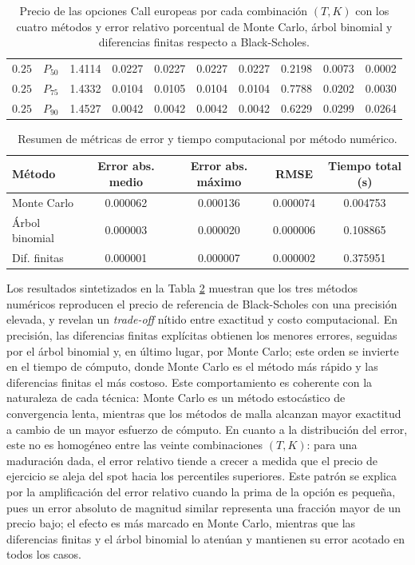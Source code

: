 \documentclass{article}
\begin{document}
\begin{table}[H]
{\begin{tabular}{llrrrrrrrr}
$0.25$   & $P_{50}$ & 1.4114 & 0.0227 & 0.0227 & 0.0227 & 0.0227 & 0.2198 & 0.0073 & 0.0002 \\
$0.25$   & $P_{75}$ & 1.4332 & 0.0104 & 0.0105 & 0.0104 & 0.0104 & 0.7788 & 0.0202 & 0.0030 \\
$0.25$   & $P_{90}$ & 1.4527 & 0.0042 & 0.0042 & 0.0042 & 0.0042 & 0.6229 & 0.0299 & 0.0264 \\
\hline
\end{tabular}
}
\caption{Precio de las opciones Call europeas por cada combinación $(T,K)$ con los cuatro métodos y error relativo porcentual de Monte Carlo, árbol binomial y diferencias finitas respecto a Black-Scholes.}
\label{tab:precios_TK}
\end{table}

\begin{table}[H]
\centering
\begin{tabular}{lcccc}
\hline
Método & Error abs. medio & Error abs. máximo & RMSE & Tiempo total (s) \\
\hline
Monte Carlo     & 0.000062 & 0.000136 & 0.000074 & 0.004753 \\
Árbol binomial  & 0.000003 & 0.000020 & 0.000006 & 0.108865 \\
Dif. finitas    & 0.000001 & 0.000007 & 0.000002 & 0.375951 \\
\hline
\end{tabular}
\caption{Resumen de métricas de error y tiempo computacional por método numérico.}
\label{tab:resumen_metodos}
\end{table}

Los resultados sintetizados en la Tabla \ref{tab:resumen_metodos} muestran que los tres métodos numéricos reproducen el precio de referencia de Black-Scholes con una precisión elevada, y revelan un \textit{trade-off} nítido entre exactitud y costo computacional. En precisión, las diferencias finitas explícitas obtienen los menores errores, seguidas por el árbol binomial y, en último lugar, por Monte Carlo; este orden se invierte en el tiempo de cómputo, donde Monte Carlo es el método más rápido y las diferencias finitas el más costoso. Este comportamiento es coherente con la naturaleza de cada técnica: Monte Carlo es un método estocástico de convergencia lenta, mientras que los métodos de malla alcanzan mayor exactitud a cambio de un mayor esfuerzo de cómputo. En cuanto a la distribución del error, este no es homogéneo entre las veinte combinaciones $(T,K)$: para una maduración dada, el error relativo tiende a crecer a medida que el precio de ejercicio se aleja del spot hacia los percentiles superiores. Este patrón se explica por la amplificación del error relativo cuando la prima de la opción es pequeña, pues un error absoluto de magnitud similar representa una fracción mayor de un precio bajo; el efecto es más marcado en Monte Carlo, mientras que las diferencias finitas y el árbol binomial lo atenúan y mantienen su error acotado en todos los casos.
\end{document}
